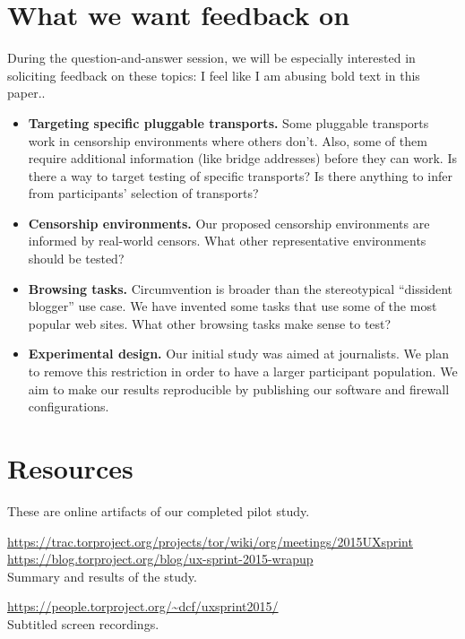 \documentclass{sig-alternate-hotpets15}
\begin{document}
\section{What we want feedback on}

During the question-and-answer session,
we will be especially interested in soliciting feedback
on these topics:
{\color {red} I feel like I am abusing bold text in this paper..}

\begin{itemize} \itemsep1pt \parskip0pt 
\item {\bfseries Targeting specific pluggable transports.}
Some pluggable transports work in censorship environments
where others don't.
Also, some of them require additional information
(like bridge addresses) before they can work.
Is there a way to target testing of specific transports?
Is there anything to infer from participants' selection of transports?

\item {\bfseries Censorship environments.}
Our proposed censorship environments are informed
by real-world censors.
What other representative environments
should be tested?

\item {\bfseries Browsing tasks.}
Circumvention is broader than the stereotypical
``dissident blogger'' use case.
We have invented some tasks that use some of the
most popular web sites.
What other browsing tasks make sense to test?

\item {\bfseries Experimental design.}
Our initial study was aimed at journalists.
We plan to remove this restriction in order
to have a larger participant population.
We aim to make our results reproducible by publishing
our software and firewall configurations.
\end{itemize}

\section{Resources}

These are online artifacts of our completed pilot study.

\noindent \url{https://trac.torproject.org/projects/tor/wiki/org/meetings/2015UXsprint}\\
\noindent \url{https://blog.torproject.org/blog/ux-sprint-2015-wrapup}\\
\indent Summary and results of the study.

\noindent \url{https://people.torproject.org/~dcf/uxsprint2015/}\\
\indent Subtitled screen recordings.


 
\end{document}

